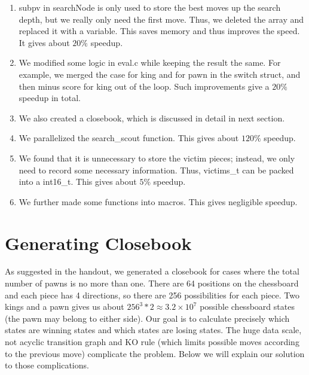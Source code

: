 \documentclass[10pt,twosidep]{article}
\begin{document}
\begin{enumerate}
  \item subpv in searchNode is only used to store the best moves up the search depth, but we really only need the first move. Thus, we deleted the array and replaced it with a variable. This saves memory and thus improves the speed. It gives about $20\%$ speedup.
  \item We modified some logic in eval.c while keeping the result the same. For example, we merged the case for king and for pawn in the switch struct, and then minus score for king out of the loop. Such improvements give a $20\%$ speedup in total.
  \item We also created a closebook, which is discussed in detail in next section.
  \item We parallelized the search\_scout function. This gives about $120\%$ speedup.
  \item We found that it is unnecessary to store the victim pieces; instead, we only need to record some necessary information. Thus, victims\_t can be packed into a int16\_t. This gives about $5\%$ speedup.
  \item We further made some functions into macros. This gives negligible speedup.
\end{enumerate}

\section{Generating Closebook}
	As suggested in the handout, we generated a closebook 
	for cases where the total number of pawns is no more than one. 
	There are 64 positions on the chessboard and each piece has 4 directions, 
	so there are 256 possibilities for each piece. 
	Two kings and a pawn gives us about $256^3*2\approx 3.2\times 10^7$ possible chessboard states 
	(the pawn may belong to either side).
	Our goal is to calculate precisely which states are winning states and which states are losing states.
	The huge data scale, not acyclic transition graph and KO rule 
	(which limits possible moves according to the previous move) complicate the problem.
	Below we will explain our solution to those complications. 
\end{document}
